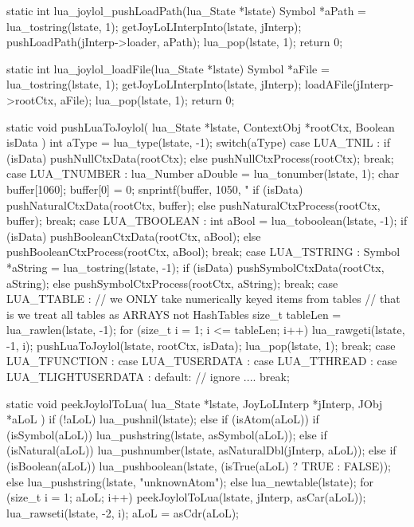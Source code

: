 static int lua_joylol_pushLoadPath(lua_State *lstate) {
  Symbol *aPath = lua_tostring(lstate, 1);
  getJoyLoLInterpInto(lstate, jInterp);
  pushLoadPath(jInterp->loader, aPath);
  lua_pop(lstate, 1);
  return 0;
}

static int lua_joylol_loadFile(lua_State *lstate) {
  Symbol *aFile = lua_tostring(lstate, 1);
  getJoyLoLInterpInto(lstate, jInterp);
  loadAFile(jInterp->rootCtx, aFile);
  lua_pop(lstate, 1);
  return 0;
}
\stopCCode

\startCCode
static void pushLuaToJoylol(
  lua_State  *lstate,
  ContextObj *rootCtx,
  Boolean     isData
) {
  int aType = lua_type(lstate, -1);
  switch(aType) {
  case LUA_TNIL : {
    if (isData) {
      pushNullCtxData(rootCtx);
    } else {
      pushNullCtxProcess(rootCtx);
    }
  } break;
  case LUA_TNUMBER : {
    lua_Number aDouble = lua_tonumber(lstate, 1);
    char buffer[1060];
    buffer[0] = 0;
    snprintf(buffer, 1050, "%
    if (isData) {
      pushNaturalCtxData(rootCtx, buffer);
    } else {
      pushNaturalCtxProcess(rootCtx, buffer);
    }
  } break;
  case LUA_TBOOLEAN : {
    int aBool = lua_toboolean(lstate, -1);
    if (isData) {
      pushBooleanCtxData(rootCtx, aBool);
    } else {
      pushBooleanCtxProcess(rootCtx, aBool);
    }
  } break;
  case LUA_TSTRING : {
    Symbol *aString = lua_tostring(lstate, -1);
    if (isData) {
      pushSymbolCtxData(rootCtx, aString);
    } else {
      pushSymbolCtxProcess(rootCtx, aString);
    }
  } break;
  case LUA_TTABLE : {
    // we ONLY take numerically keyed items from tables
    // that is we treat all tables as ARRAYS not HashTables
    size_t tableLen = lua_rawlen(lstate, -1);
    for (size_t i = 1; i <= tableLen; i++) {
      lua_rawgeti(lstate, -1, i);
      pushLuaToJoylol(lstate, rootCtx, isData);
      lua_pop(lstate, 1);
    }
  } break;
  case LUA_TFUNCTION :
  case LUA_TUSERDATA :
  case LUA_TTHREAD :
  case LUA_TLIGHTUSERDATA :
  default:
    // ignore ....
    break;
  }
}
\stopCCode

\startCCode
static void peekJoylolToLua(
  lua_State    *lstate,
  JoyLoLInterp *jInterp,
  JObj         *aLoL
) {
  if (!aLoL) {
    lua_pushnil(lstate);
  } else if (isAtom(aLoL)) {
    if (isSymbol(aLoL)) {
      lua_pushstring(lstate, asSymbol(aLoL));
    } else if (isNatural(aLoL)) {
      lua_pushnumber(lstate, asNaturalDbl(jInterp, aLoL));
    } else if (isBoolean(aLoL)) {
      lua_pushboolean(lstate, (isTrue(aLoL) ? TRUE : FALSE));
    } else {
      lua_pushstring(lstate, "unknownAtom");
    }
  } else {
    lua_newtable(lstate);
    for (size_t i = 1; aLoL; i++) {
      peekJoylolToLua(lstate, jInterp, asCar(aLoL));
      lua_rawseti(lstate, -2, i);
      aLoL = asCdr(aLoL);
    }
  }
}
\stopCCode


